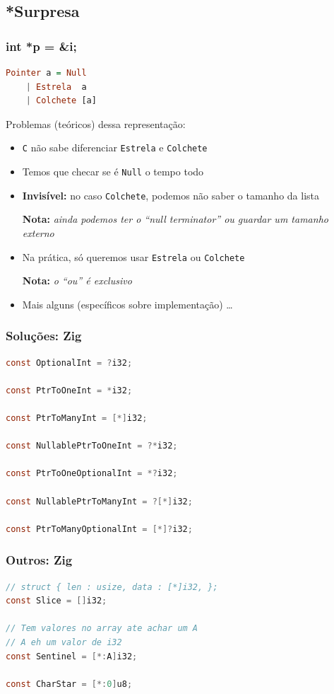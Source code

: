 \documentclass{beamer}
\newcommand{\nota}[1]{\textbf{Nota:}\textit{ #1}}
\begin{document}
\subsection{*Surpresa}
\begin{frame}[fragile]
    \frametitle{int *p = \&i;}
    \begin{lstlisting}[language=Haskell]
Pointer a = Null
    | Estrela  a
    | Colchete [a]
    \end{lstlisting}
    \vfill
    Problemas (teóricos) dessa representação:
    \begin{itemize}
        \item
            \texttt{C} não sabe diferenciar
            \texttt{Estrela} e \texttt{Colchete}
        \item
            Temos que checar se é \texttt{Null} o tempo todo
        \item
            \textbf{Invisível:} no caso \texttt{Colchete},
            podemos não saber o tamanho da lista
            \par
            \nota{ainda podemos ter o ``null terminator''
            ou guardar um tamanho externo}
        \item
            Na prática, só queremos usar
            \texttt{Estrela} ou \texttt{Colchete}
            \par
            \nota{o ``ou'' é exclusivo}
        \item
            Mais alguns (específicos sobre implementação) \dots
    \end{itemize}
\end{frame}

\begin{frame}[fragile]
    \frametitle{Soluções: Zig}
    \begin{lstlisting}[language=C]
const OptionalInt = ?i32;

const PtrToOneInt = *i32;

const PtrToManyInt = [*]i32;

const NullablePtrToOneInt = ?*i32;

const PtrToOneOptionalInt = *?i32;

const NullablePtrToManyInt = ?[*]i32;

const PtrToManyOptionalInt = [*]?i32;
    \end{lstlisting}
\end{frame}

\begin{frame}[fragile]
    \frametitle{Outros: Zig}
    \begin{lstlisting}[language=C]
// struct { len : usize, data : [*]i32, };
const Slice = []i32;

// Tem valores no array ate achar um A
// A eh um valor de i32
const Sentinel = [*:A]i32;

const CharStar = [*:0]u8;
    \end{lstlisting}
\end{frame}
\end{document}
